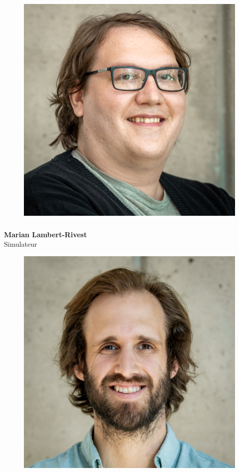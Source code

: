 \documentclass[a0paper,portrait]{baposter}
\begin{document}
\begin{poster}
{\begin{figure}
\includegraphics[width=.9\linewidth]{img/membres/Marian-Lambert-Rivest-3.jpg} 
\end{figure}
\subsubsection*{}
\vspace{2mm}
\textbf{Marian Lambert-Rivest}\\
Simulateur

\begin{figure}
\includegraphics[width=.9\linewidth]{img/membres/Mathieu-Parent-2.jpg} 
\end{figure}
}
\end{poster}
\end{document}
